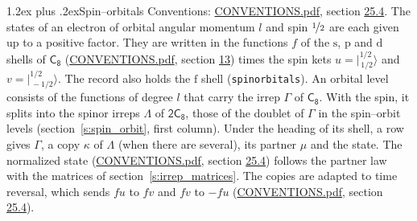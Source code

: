 \documentclass[10pt,a4paper]{article}
\makeatletter
\renewcommand\section{\@startsection{section}{1}{\z@}{-3ex plus -1ex minus -.2ex}%
  {1.2ex plus .2ex}{\normalfont\large\sffamily\bfseries\color{parttitle}}}
\numberwithin{equation}{section}
\newcommand{\grp}[1]{\mathsf{#1}}
\newcommand{\orbital}[1]{\mathrm{#1}}
\newcommand{\mult}{\kappa}
\newcommand{\intx}{\mu}
\newcommand{\jm}[2]{\bigl\lvert{}^{#1}_{\,#2}\bigr\rangle}
\makeatother
\begin{document}
\section{Spin--orbitals}\label{s:spin_orbitals}
Conventions: \href{../../CONVENTIONS.pdf}{CONVENTIONS.pdf}, section \href{../../CONVENTIONS.pdf\#conv.25.4}{25.4}.
\leavevmode\label{n:index.orbital.l}The states of an electron of orbital angular momentum $l$ and spin $\nicefrac{1}{2}$ are each given up to a positive factor. \label{n:local.spinor.uv}\label{n:local.function.f}They are written in the functions $f$ of the $\orbital{s}$, $\orbital{p}$ and $\orbital{d}$ shells of \href{../../../rotation/data/pdf/C8.pdf}{$\grp{C_{8}}$} (\href{../../CONVENTIONS.pdf}{CONVENTIONS.pdf}, section \href{../../../rotation/CONVENTIONS.pdf\#conv.13}{13}) times the spin kets $u = \jm{1/2}{1/2}$ and $v = \jm{1/2}{-1/2}$. The record also holds the $\orbital{f}$ shell (\texttt{spinorbitals}). An orbital level consists of the functions of degree $l$ that carry the irrep $\Gamma$ of \href{../../../rotation/data/pdf/C8.pdf}{$\grp{C_{8}}$}. With the spin, it splits into the spinor irreps $\Lambda$ of $\grp{2C_{8}}$, those of the doublet of $\Gamma$ in the spin--orbit levels (section~\ref{s:spin_orbit}, first column). \label{n:head.state}Under the heading of its shell, a row gives $\Gamma$, a copy $\mult$ of $\Lambda$ (when there are several), its partner $\intx$ and the state. The normalized state (\href{../../CONVENTIONS.pdf}{CONVENTIONS.pdf}, section \href{../../CONVENTIONS.pdf\#conv.25.4}{25.4}) follows the partner law with the matrices of section~\ref{s:irrep_matrices}. The copies are adapted to time reversal, which sends $f u$ to $f v$ and $f v$ to $-f u$ (\href{../../CONVENTIONS.pdf}{CONVENTIONS.pdf}, section \href{../../CONVENTIONS.pdf\#conv.25.4}{25.4}).
\end{document}
